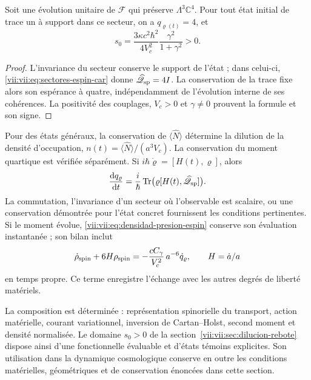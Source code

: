 \begin{corollary}
\label{vii:vii:cor:dominio-positivo-conservado}
Soit une évolution unitaire de \(\mathcal F\) qui préserve
\(\Lambda^3\mathbb C^4\). Pour tout état initial de trace un
à support dans ce secteur, on a \(q_{\varrho(t)}=4\), et
\begin{equation}
 s_0=\frac{3\kappa c^2\hbar^2}{4V_c^2}
                   \frac{\gamma^2}{1+\gamma^2}>0.
 \label{vii:vii:eq:amplitud-positiva-sector-tres}
\end{equation}
\end{corollary}
\begin{proof}
L'invariance du secteur conserve le support de l'état ; dans celui-ci,
\eqref{vii:vii:eq:sectores-espin-car} donne
\(\widehat{\mathscr Q}_{\rm sp}=4I\). La conservation de la
trace fixe alors son espérance à quatre, indépendamment de
l'évolution interne de ses cohérences. La positivité des
couplages, \(V_c>0\) et \(\gamma\ne0\) prouvent la formule
et son signe.
\end{proof}

Pour des états généraux, la conservation de
\(\langle\widehat N\rangle\) détermine la dilution de la densité
d'occupation, \(n(t)=\langle\widehat N\rangle/(a^3V_c)\).
La conservation du moment quartique est vérifiée séparément.
Si \(i\hbar\dot\varrho=[H(t),\varrho]\), alors
\begin{equation}
 \frac{\mathrm d q_\varrho}{\mathrm dt}
 =\frac{i}{\hbar}\operatorname{Tr}
       \bigl(\varrho[H(t),\widehat{\mathscr Q}_{\rm sp}]\bigr).
 \label{vii:vii:eq:conservacion-momento-cuartico}
\end{equation}
La commutation, l'invariance d'un secteur où l'observable est scalaire, ou une conservation démontrée pour l'état concret fournissent les conditions pertinentes. Si le moment évolue, \eqref{vii:vii:eq:densidad-presion-espin} conserve son évaluation instantanée ; son bilan inclut
\[
 \dot\rho_{\rm spin}+6H\rho_{\rm spin}
 =-\frac{cC_\gamma}{V_c^2}\,a^{-6}\dot q_\varrho,
 \qquad H=\dot a/a
\]
en temps propre. Ce terme enregistre l'échange avec les
autres degrés de liberté matériels.

La composition est déterminée : représentation spinorielle du
transport, action matérielle, courant variationnel, inversion de
Cartan--Holst, second moment et densité normalisée. Le domaine
\(s_0>0\) de la section~\ref{vii:vii:sec:dilucion-rebote} dispose ainsi
d'une fonctionnelle évaluable et d'états témoins explicites. Son utilisation dans
la dynamique cosmologique conserve en outre les conditions matérielles,
géométriques et de conservation énoncées dans cette section.
